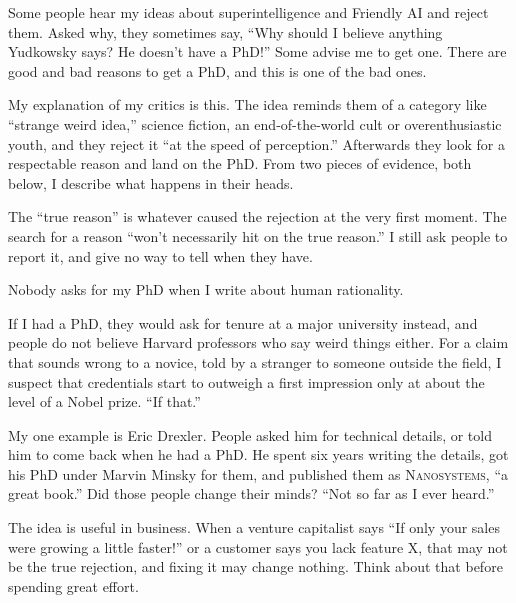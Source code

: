 
Some people hear my ideas about superintelligence and Friendly AI and reject them. Asked why, they sometimes say, ``Why should I believe anything Yudkowsky says? He doesn't have a PhD!'' Some advise me to get one. There are good and bad reasons to get a PhD, and this is one of the bad ones.

My explanation of my critics is this. The idea reminds them of a category like ``strange weird idea,'' science fiction, an end-of-the-world cult or overenthusiastic youth, and they reject it ``at the speed of perception.'' Afterwards they look for a respectable reason and land on the PhD. From two pieces of evidence, both below, I describe what happens in their heads.

The ``true reason'' is whatever caused the rejection at the very first moment. The search for a reason ``won't necessarily hit on the true reason.'' I still ask people to report it, and give no way to tell when they have.

Nobody asks for my PhD when I write about human rationality. 

If I had a PhD, they would ask for tenure at a major university instead, and people do not believe Harvard professors who say weird things either. For a claim that sounds wrong to a novice, told by a stranger to someone outside the field, I suspect that credentials start to outweigh a first impression only at about the level of a Nobel prize. ``If that.''

My one example is Eric Drexler. People asked him for technical details, or told him to come back when he had a PhD. He spent six years writing the details, got his PhD under Marvin Minsky for them, and published them as \textsc{Nanosystems}, ``a great book.'' Did those people change their minds? ``Not so far as I ever heard.'' 

The idea is useful in business. When a venture capitalist says ``If only your sales were growing a little faster!'' or a customer says you lack feature X, that may not be the true rejection, and fixing it may change nothing. Think about that before spending great effort.

